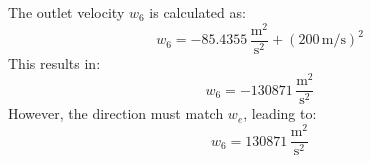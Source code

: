 The outlet velocity \( w_6 \) is calculated as:  
\[
w_6 = -85.4355 \, \frac{\text{m}^2}{\text{s}^2} + (200 \, \text{m/s})^2
\]  
This results in:  
\[
w_6 = -130871 \, \frac{\text{m}^2}{\text{s}^2}
\]  
However, the direction must match \( w_e \), leading to:  
\[
w_6 = 130871 \, \frac{\text{m}^2}{\text{s}^2}
\]